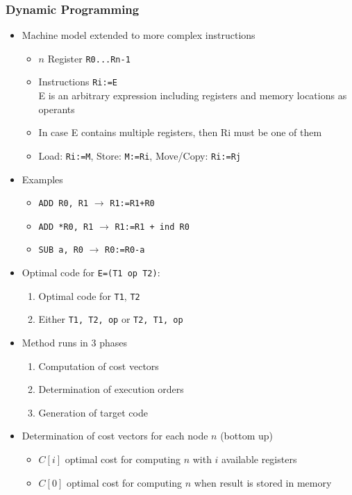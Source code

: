 \subsubsection{Dynamic Programming}
\begin{itemize}
	\item Machine model extended to more complex instructions
\begin{itemize}
	\item $n$ Register \verb|R0...Rn-1|
	\item Instructions \verb|Ri:=E| \\
			E is an arbitrary expression including registers and memory locations as operants
	\item  In case E contains multiple registers, then Ri must be one of them
	\item Load: \verb|Ri:=M|, Store: \verb|M:=Ri|, Move/Copy: \verb|Ri:=Rj|
\end{itemize}
	\item Examples
\begin{itemize}
	\item \verb|ADD R0, R1| $\rightarrow$ \verb|R1:=R1+R0|
	\item \verb|ADD *R0, R1| $\rightarrow$ \verb|R1:=R1 + ind R0|
	\item \verb|SUB a, R0| $\rightarrow$ \verb|R0:=R0-a|
\end{itemize}
	\item Optimal code for \verb|E=(T1 op T2)|:
\begin{enumerate}
	\item Optimal code for \verb|T1|, \verb|T2|
	\item Either \verb|T1, T2, op| or \verb|T2, T1, op|
\end{enumerate}
	\item Method runs in 3 phases
\begin{enumerate}
    \item Computation of cost vectors
    \item Determination of execution orders
    \item Generation of target code
\end{enumerate}
	\item Determination of cost vectors for each node $n$ (bottom up)
\begin{itemize}
	\item $C[i]$ optimal cost for computing $n$ with $i$ available registers
	\item $C[0]$ optimal cost for computing $n$ when result is stored in memory
\end{itemize}
\end{itemize}

